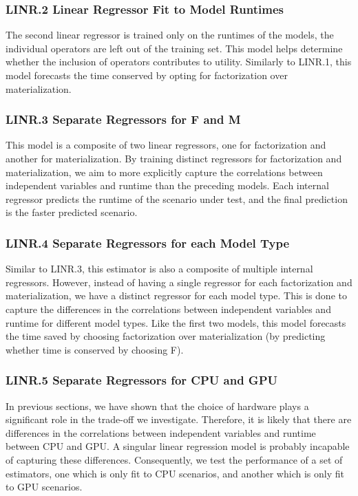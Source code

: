 \subsubsection*{LINR.2 Linear Regressor Fit to Model Runtimes}
The second linear regressor is trained only on the runtimes of the models, the individual operators are left out of the training set. This model helps determine whether the inclusion of operators contributes to utility. Similarly to LINR.1, this model forecasts the time conserved by opting for factorization over materialization.

\subsubsection*{LINR.3 Separate Regressors for F and M}
This model is a composite of two linear regressors, one for factorization and another for materialization. By training distinct regressors for factorization and materialization, we aim to more explicitly capture the correlations between independent variables and runtime than the preceding models. Each internal regressor predicts the runtime of the scenario under test, and the final prediction is the faster predicted scenario.

\subsubsection*{LINR.4 Separate Regressors for each Model Type}
Similar to LINR.3, this estimator is also a composite of multiple internal regressors. However, instead of having a single regressor for each factorization and materialization, we have a distinct regressor for each model type. This is done to capture the differences in the correlations between independent variables and runtime for different model types. Like the first two models, this model forecasts the time saved by choosing factorization over materialization (by predicting whether time is conserved by choosing F).

\subsubsection*{LINR.5 Separate Regressors for CPU and GPU}
In previous sections, we have shown that the choice of hardware plays a significant role in the trade-off we investigate. Therefore, it is likely that there are differences in the correlations between independent variables and runtime between CPU and GPU. A singular linear regression model is probably incapable of capturing these differences. Consequently, we test the performance of a set of estimators, one which is only fit to CPU scenarios, and another which is only fit to GPU scenarios.

